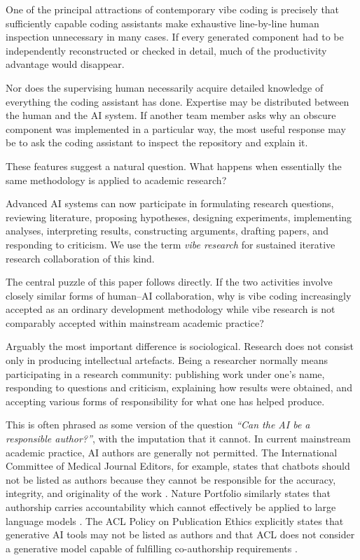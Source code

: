 One of the principal attractions of contemporary vibe coding is precisely that sufficiently capable coding assistants make exhaustive line-by-line human inspection unnecessary in many cases. If every generated component had to be independently reconstructed or checked in detail, much of the productivity advantage would disappear.

Nor does the supervising human necessarily acquire detailed knowledge of everything the coding assistant has done. Expertise may be distributed between the human and the AI system. If another team member asks why an obscure component was implemented in a particular way, the most useful response may be to ask the coding assistant to inspect the repository and explain it.

These features suggest a natural question. What happens when essentially the same methodology is applied to academic research?

Advanced AI systems can now participate in formulating research questions, reviewing literature, proposing hypotheses, designing experiments, implementing analyses, interpreting results, constructing arguments, drafting papers, and responding to criticism. We use the term \emph{vibe research} for sustained iterative research collaboration of this kind.

The central puzzle of this paper follows directly. If the two activities involve closely similar forms of human--AI collaboration, why is vibe coding increasingly accepted as an ordinary development methodology while vibe research is not comparably accepted within mainstream academic practice?

Arguably the most important difference is sociological. Research does not consist only in producing intellectual artefacts. Being a researcher normally means participating in a research community: publishing work under one's name, responding to questions and criticism, explaining how results were obtained, and accepting various forms of responsibility for what one has helped produce.

This is often phrased as some version of the question \emph{``Can the AI be a responsible author?''}, with the imputation that it cannot. In current mainstream academic practice, AI authors are generally not permitted. The International Committee of Medical Journal Editors, for example, states that chatbots should not be listed as authors because they cannot be responsible for the accuracy, integrity, and originality of the work \citep{icmje2026ai}. Nature Portfolio similarly states that authorship carries accountability which cannot effectively be applied to large language models \citep{nature2026ai}. The ACL Policy on Publication Ethics explicitly states that generative AI tools may not be listed as authors and that ACL does not consider a generative model capable of fulfilling co-authorship requirements \citep{acl2026policy}.

